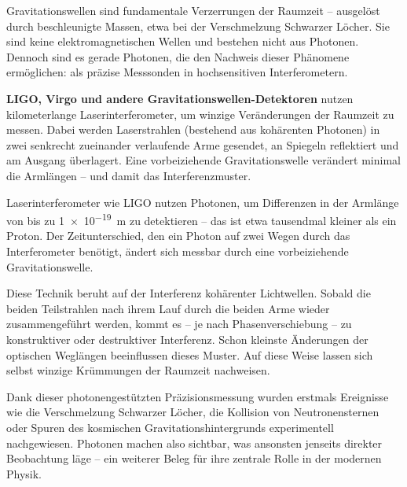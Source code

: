 Gravitationswellen sind fundamentale Verzerrungen der Raumzeit – ausgelöst durch beschleunigte Massen, etwa bei der Verschmelzung Schwarzer Löcher. Sie sind keine elektromagnetischen Wellen und bestehen nicht aus Photonen. Dennoch sind es gerade Photonen, die den Nachweis dieser Phänomene ermöglichen: als präzise Messsonden in hochsensitiven Interferometern.

\vspace{0.5em}
\textbf{LIGO, Virgo und andere Gravitationswellen-Detektoren} nutzen kilometerlange Laserinterferometer, um winzige Veränderungen der Raumzeit zu messen. Dabei werden Laserstrahlen (bestehend aus kohärenten Photonen) in zwei senkrecht zueinander verlaufende Arme gesendet, an Spiegeln reflektiert und am Ausgang überlagert. Eine vorbeiziehende Gravitationswelle verändert minimal die Armlängen – und damit das Interferenzmuster.

\vspace{1em}
\begin{tcolorbox}[physikbox, title=Photonen als Messwerkzeug für Raumkrümmung]
	\label{box:messwerkzeug}
	\small
	Laserinterferometer wie LIGO nutzen Photonen, um Differenzen in der Armlänge von bis zu \SI{1e-19}{m} zu detektieren – das ist etwa tausendmal kleiner als ein Proton. Der Zeitunterschied, den ein Photon auf zwei Wegen durch das Interferometer benötigt, ändert sich messbar durch eine vorbeiziehende Gravitationswelle.
\end{tcolorbox}

Diese Technik beruht auf der Interferenz kohärenter Lichtwellen. Sobald die beiden Teilstrahlen nach ihrem Lauf durch die beiden Arme wieder zusammengeführt werden, kommt es – je nach Phasenverschiebung – zu konstruktiver oder destruktiver Interferenz. Schon kleinste Änderungen der optischen Weglängen beeinflussen dieses Muster. Auf diese Weise lassen sich selbst winzige Krümmungen der Raumzeit nachweisen.

\vspace{0.5em}
Dank dieser photonengestützten Präzisionsmessung wurden erstmals Ereignisse wie die Verschmelzung Schwarzer Löcher, die Kollision von Neutronensternen oder Spuren des kosmischen Gravitationshintergrunds experimentell nachgewiesen. Photonen machen also sichtbar, was ansonsten jenseits direkter Beobachtung läge – ein weiterer Beleg für ihre zentrale Rolle in der modernen Physik.

